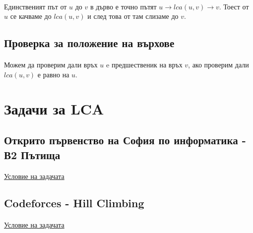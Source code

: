 \documentclass[12pt]{article}
\begin{document}
\paragraph*{}
Единственият път от $u$ до $v$ в дърво е точно пътят $u \rightarrow lca(u, v) \rightarrow v$. Тоест от $u$ се качваме до $lca(u, v)$ и след това от там слизаме до $v$. 
\subsection*{Проверка за положение на върхове}
\paragraph*{}
Можем да проверим дали връх $u$ e предшественик на връх $v$, ако проверим дали $lca(u, v)$ е равно на $u$.

\section*{Задачи за LCA}
\subsection*{Открито първенство на София по информатика - В2 Пътища}
\paragraph*{}
\href{https://arena.olimpiici.com/#/catalog/533/problem/1326}{Условие на задачата} 

\subsection*{Codeforces - Hill Climbing}
\paragraph*{}
\href{https://codeforces.com/problemset/problem/406/D}{Условие на задачата}
\end{document}
